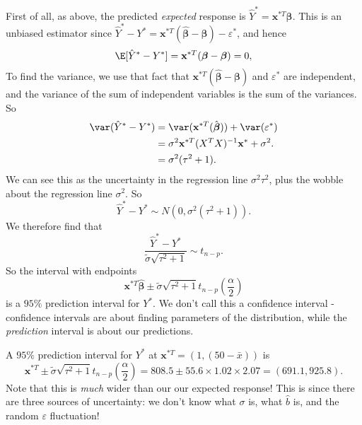 \documentclass[a4paper]{article}
\begin{document}
First of all, as above, the predicted \emph{expected} response is $\hat{Y}^* = \mathbf{x}^{*T}\boldsymbol\beta$. This is an unbiased estimator since $\hat{Y}^* - Y^* = \mathbf{x}^{*T}(\hat{\boldsymbol\beta} - \boldsymbol\beta) - \varepsilon^*$, and hence
\[
  \E[\hat{Y}^* - Y^*] = \mathbf{x}^{*T}(\boldsymbol\beta - \boldsymbol\beta) = 0,
\]
To find the variance, we use that fact that $\mathbf{x}^{*T}(\hat{\boldsymbol\beta} - \boldsymbol\beta)$ and $\varepsilon^*$ are independent, and the variance of the sum of independent variables is the sum of the variances. So
\begin{align*}
  \var(\hat{Y}^* - Y^*) &= \var (\mathbf{x}^{*T}(\hat{\boldsymbol\beta})) + \var (\varepsilon^*)\\
  &= \sigma^2 \mathbf{x}^{*T}(X^TX)^{-1}\mathbf{x}^* + \sigma^2.\\
  &= \sigma^2(\tau^2 + 1).
\end{align*}
We can see this as the uncertainty in the regression line $\sigma^2\tau^2$, plus the wobble about the regression line $\sigma^2$. So
\[
  \hat{Y}^* - Y^* \sim N(0, \sigma^2(\tau^2 + 1)).
\]
We therefore find that
\[
  \frac{\hat{Y}^* - Y^*}{\tilde{\sigma}\sqrt{\tau^2 + 1}} \sim t_{n - p}.
\]
So the interval with endpoints
\[
  \mathbf{x}^{*T}\hat{\boldsymbol\beta} \pm \tilde{\sigma}\sqrt{\tau^2 + 1}t_{n - p}\left(\frac{\alpha}{2}\right)
\]
is a $95\%$ prediction interval for $Y^*$. We don't call this a confidence interval - confidence intervals are about finding parameters of the distribution, while the \emph{prediction} interval is about our predictions.

\begin{eg}
  A $95\%$ prediction interval for $Y^*$ at $\mathbf{x}^{*T} = (1, (50 - \bar x))$ is
  \[
    \mathbf{x}^{*T}\pm \tilde{\sigma}\sqrt{\tau^2 + 1}t_{n - p}\left(\frac{\alpha}{2}\right) = 808.5\pm 55.6 \times 1.02 \times 2.07 = (691.1, 925.8).
  \]
  Note that this is \emph{much} wider than our our expected response! This is since there are three sources of uncertainty: we don't know what $\sigma$ is, what $\hat{b}$ is, and the random $\varepsilon$ fluctuation!
\end{eg}
\end{document}
